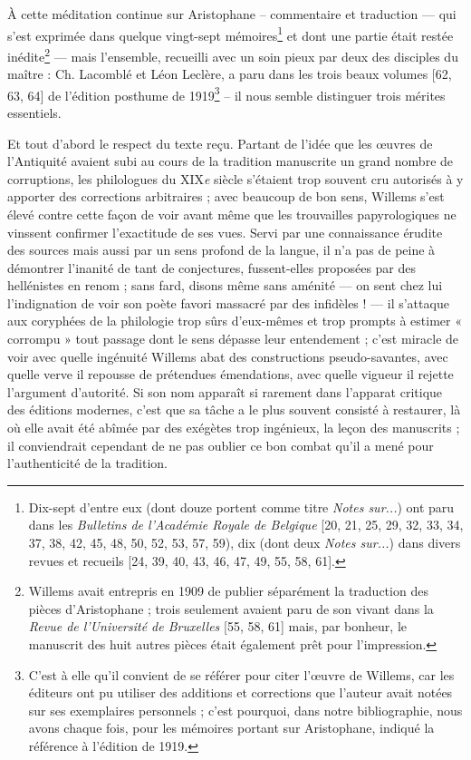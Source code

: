 \documentclass{book}%
\newcommand{\italique}[1]{\textit{#1}}%
\newcommand{\nieme}[1]{#1\italique{e}}%
\newcommand{\note}[1]{\footnote{#1}}
\begin{document}
À cette méditation continue sur Aristophane -- commentaire et traduction — qui s'est exprimée dans quelque vingt-sept mémoires\note{Dix-sept d'entre eux (dont douze portent comme titre \italique{Notes sur...}) ont paru dans les \italique{Bulletins de l'Académie Royale de Belgique} [20, 21, 25, 29, 32, 33, 34, 37, 38, 42, 45, 48, 50, 52, 53, 57, 59), dix (dont deux \italique{Notes sur...}) dans divers revues et recueils [24, 39, 40, 43, 46, 47, 49, 55, 58, 61].} et dont une partie était restée inédite\note{Willems avait entrepris en 1909 de publier séparément la traduction des pièces d'Aristophane ; trois seulement avaient paru de son vivant dans la \italique{Revue de l'Université de Bruxelles} [55, 58, 61] mais, par bonheur, le manuscrit des huit autres pièces était également prêt pour l'impression.} — mais l'ensemble, recueilli avec un soin pieux par deux des disciples du maître : Ch. Lacomblé et Léon Leclère, a paru dans les trois beaux volumes [62, 63, 64] de l'édition posthume de 1919\note{C'est à elle qu'il convient de se référer pour citer l'œuvre de Willems, car les éditeurs ont pu utiliser des additions et corrections que l'auteur avait notées sur ses exemplaires personnels ; c'est pourquoi, dans notre bibliographie, nous avons chaque fois, pour les mémoires portant sur Aristophane, indiqué la référence à l'édition de 1919.} -- il nous semble distinguer trois mérites essentiels. 

Et tout d'abord le respect du texte reçu. 
Partant de l'idée que les œuvres de l'Antiquité avaient subi au cours de la tradition manuscrite un grand nombre de corruptions, les philologues du \nieme{XIX} siècle s'étaient trop souvent cru autorisés à y apporter des corrections arbitraires ; avec beaucoup de bon sens, Willems s'est élevé contre cette façon de voir avant même que les trouvailles papyrologiques ne vinssent confirmer l'exactitude de ses vues.
Servi par une connaissance érudite des sources mais aussi par un sens profond de la langue, il n'a pas de peine à démontrer l'inanité de tant de conjectures, fussent-elles proposées par des hellénistes en renom ; sans fard, disons même sans aménité — on sent chez lui l'indignation de voir son poète favori massacré par des infidèles ! — il s'attaque aux coryphées de la philologie trop sûrs d'eux-mêmes et trop prompts à estimer « corrompu » tout passage dont le sens dépasse leur entendement ; c'est miracle de voir avec quelle ingénuité Willems abat des constructions pseudo-savantes, avec quelle verve il repousse de prétendues émendations, avec quelle vigueur il rejette l'argument d'autorité.
Si son nom apparaît si rarement dans l'apparat critique des éditions modernes, c'est que sa tâche a le plus souvent consisté à restaurer, là où elle avait été abîmée par des exégètes trop ingénieux, la leçon des manuscrits ; il conviendrait cependant de ne pas oublier ce bon combat qu'il a mené pour l'authenticité de la tradition. 
\end{document}
